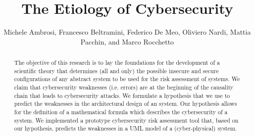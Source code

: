 \documentclass[runningheads]{llncs}
\begin{document}
\title{The Etiology of Cybersecurity}

\author{Michele Ambrosi, Francesco Beltramini, Federico De Meo,
 Oliviero Nardi, Mattia Pacchin, and Marco Rocchetto}


\maketitle

\begin{abstract}
	The objective of this research is to lay the foundations for the
	development of a scientific theory that determines (all and only) the
	possible insecure and secure configurations of any abstract system to be used for the risk assessment of systems. We
	claim that cybersecurity weaknesses (i.e. errors) are at the beginning
	of the causality chain that leads to cybersecurity attacks.  We
	formulate a hypothesis that we
	use to predict the weaknesses in the architectural design of an
	system. Our
	hypothesis allows for the definition of a mathematical formula which
	describes the cybersecurity of a system.  We implemented a prototype
	cybersecurity risk assessment tool that, based on our hypothesis,
	predicts the weaknesses in a UML model of a (cyber-physical) system.
\end{abstract}
\end{document}
